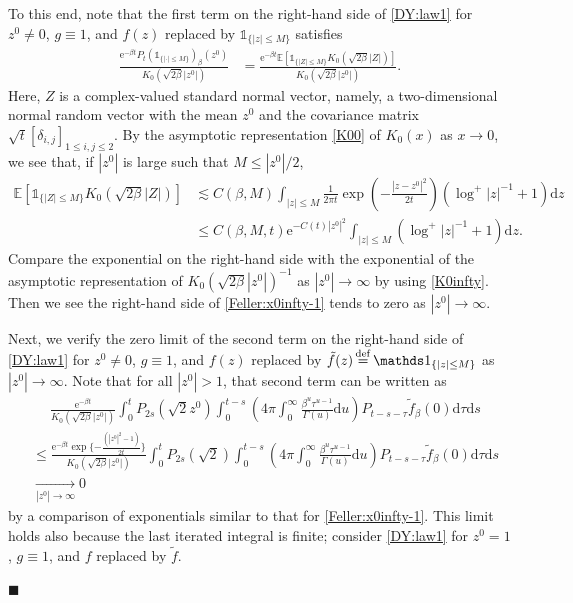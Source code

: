 \documentclass[12pt, twoside]{article}
\numberwithin{figure}{section}
\newcommand{\less}{\lesssim}
\newcommand{\e}{{\mathrm e}}
\newcommand{\1}{\mathds 1}
\newcommand{\E}{{\mathbb E}}
\renewcommand{\d}{{\mathrm d}}
\newcommand{\2}{{\mathbf 1}}
\newcommand{\defeq}{{\stackrel{\rm def}{=}}}
\renewenvironment{proof}[1][\proofname]{\noindent {\bfseries #1.}\;}{\hfill\ensuremath{\blacksquare}\\}
\newcommand{\two}{{\sqrt{2}}}
\begin{document}
\begin{proof}[Proof of Theorem~\ref{thm:formulas}]
To this end, note that the first term on the right-hand side of \eqref{DY:law1} for $z^0\neq 0$, $g\equiv 1$, and $f(z)$ replaced by $\1_{\{|z|\leq M\}}$ satisfies 
\begin{align}
 \frac{\e^{-\beta t}P_{t}(\1_{\{|\cdot|\leq M\}})_{\beta}(z^0)}{K_0(\sqrt{2\beta}|z^0|)}&=\frac{\e^{-\beta t}\E[\1_{\{|Z|\leq M\}}K_0(\sqrt{2\beta}|Z|)]}{K_0(\sqrt{2\beta}|z^0|)}.\label{Feller:x0infty-1}
\end{align}
Here, $Z$ is a complex-valued standard normal vector, namely, a two-dimensional normal random vector with the mean $z^0$ and the covariance matrix $\sqrt{t}[\delta_{i,j}]_{1\leq i,j\leq 2}$. By the asymptotic representation \eqref{K00} of $K_0(x)$ as $x\to0$, we see that, if $|z^0|$ is large such that $M\leq |z^0|/2 $,
\begin{align*}
\E[\1_{\{|Z|\leq M\}}K_0(\sqrt{2\beta}|Z|)]&\less C(\beta,M) \int_{|z|\leq M}\frac{1}{2\pi t}\exp\left(-\frac{|z-z^0|^2}{2t}\right)(\log^+|z|^{-1}+1)\d z\\
&\leq C(\beta,M,t)\e^{-C(t)|z^0|^2}\int_{|z|\leq M}(\log^+|z|^{-1}+1)\d z.
\end{align*}
Compare the exponential on the right-hand side with the exponential of the asymptotic representation of $K_0(\sqrt{2\beta}|z^0|)^{-1}$ as $|z^0|\to\infty$ by using \eqref{K0infty}. Then we see the right-hand side of \eqref{Feller:x0infty-1} tends to zero as $|z^0|\to\infty$. 

Next, we verify the zero limit of the second term on the right-hand side of \eqref{DY:law1} for $z^0\neq 0$, $g\equiv 1$, and $f(z)$ replaced by $\tilde{f}(z)\,\defeq\,\1_{\{|z|\leq M\}}$ as $|z^0|\to\infty$. Note that for all $|z^0|>1$, that second term can be written as
\begin{align*}
&\quad\;\frac{\e^{-\beta t}}{K_0(\sqrt{2\beta}|z^0|)}\int_0^t P_{2s}(\two z^0)\int_0^{t-s} \left(4\pi\int_0^\infty \frac{\beta^u\tau^{u-1}}{\Gamma(u)}\d u \right) P_{t-s-\tau}\tilde{f}_{\beta}(0)\d \tau\d s\\
&\leq \frac{\e^{-\beta t}\exp\{-\frac{(|z^0|^2-1)}{2t}\}}{K_0(\sqrt{2\beta}|z^0|)}\int_0^t P_{2s}(\two )\int_0^{t-s} \left(4\pi\int_0^\infty \frac{\beta^u\tau^{u-1}}{\Gamma(u)}\d u \right) P_{t-s-\tau}\tilde{f}_{\beta}(0)\d \tau\d s\\
&\xrightarrow[|z^0|\to\infty]{}0
\end{align*}
by a comparison of exponentials similar to that for \eqref{Feller:x0infty-1}. This limit holds also because  the last iterated integral is finite; consider \eqref{DY:law1} for $z^0=1$, $g\equiv 1$, and $f$ replaced by $\tilde{f}$. 
 

\end{proof}
\end{document}

